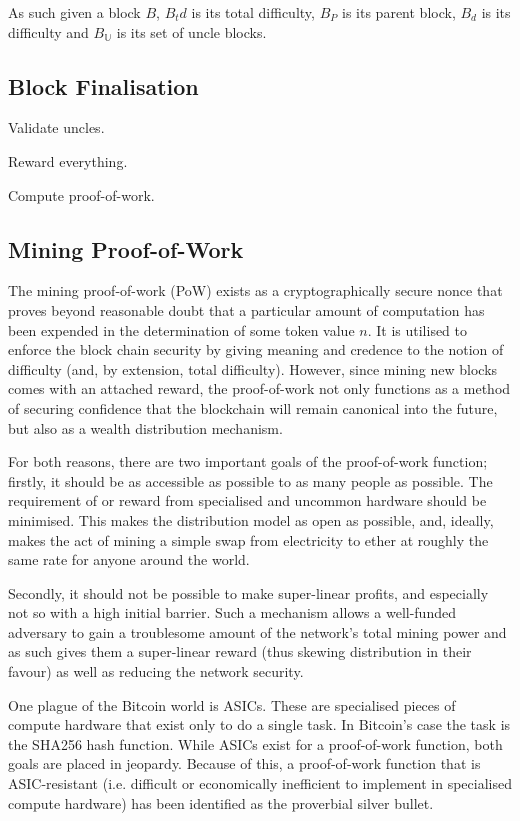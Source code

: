 \documentclass[9pt,oneside]{amsart}
\begin{document}
\begin{multicols}{2}
As such given a block $B$, $B_td$ is its total difficulty, $B_P$ is its parent block, $B_d$ is its difficulty and $B_\mathbb{U}$ is its set of uncle blocks.

\subsection{Block Finalisation} \label{ch:finalisation}

Validate uncles.

Reward everything.

Compute proof-of-work.

\subsection{Mining Proof-of-Work} \label{ch:pow}

The mining proof-of-work (PoW) exists as a cryptographically secure nonce that proves beyond reasonable doubt that a particular amount of computation has been expended in the determination of some token value $n$. It is utilised to enforce the block chain security by giving meaning and credence to the notion of difficulty (and, by extension, total difficulty). However, since mining new blocks comes with an attached reward, the proof-of-work not only functions as a method of securing confidence that the blockchain will remain canonical into the future, but also as a wealth distribution mechanism.

For both reasons, there are two important goals of the proof-of-work function; firstly, it should be as accessible as possible to as many people as possible. The requirement of or reward from specialised and uncommon hardware should be minimised. This makes the distribution model as open as possible, and, ideally, makes the act of mining a simple swap from electricity to ether at roughly the same rate for anyone around the world.

Secondly, it should not be possible to make super-linear profits, and especially not so with a high initial barrier. Such a mechanism allows a well-funded adversary to gain a troublesome amount of the network's total mining power and as such gives them a super-linear reward (thus skewing distribution in their favour) as well as reducing the network security.

One plague of the Bitcoin world is ASICs. These are specialised pieces of compute hardware that exist only to do a single task. In Bitcoin's case the task is the SHA256 hash function. While ASICs exist for a proof-of-work function, both goals are placed in jeopardy. Because of this, a proof-of-work function that is ASIC-resistant (i.e. difficult or economically inefficient to implement in specialised compute hardware) has been identified as the proverbial silver bullet.


\end{multicols}
\end{document}
